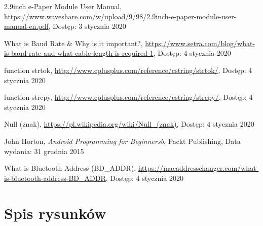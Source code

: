 \documentclass[a4paper,12pt, twoside]{article}
\begin{document}
\begin{thebibliography}{}
		2.9inch e-Paper Module User Manual,
		\newline\url{https://www.waveshare.com/w/upload/9/98/2.9inch-e-paper-module-user-manual-en.pdf}, 
		\newline Dostęp: 3 stycznia 2020
		
		What is Baud Rate \& Why is it important?,
		\newline\url{https://www.setra.com/blog/what-is-baud-rate-and-what-cable-length-is-required-1}, 
		\newline Dostęp: 4 stycznia 2020
		
		function strtok,
		\newline\url{http://www.cplusplus.com/reference/cstring/strtok/}, 
		\newline Dostęp: 4 stycznia 2020
		
		function strcpy,
		\newline\url{http://www.cplusplus.com/reference/cstring/strcpy/}, 
		\newline Dostęp: 4 stycznia 2020
		
		Null (znak),
		\newline\url{https://pl.wikipedia.org/wiki/Null_(znak)}, 
		\newline Dostęp: 4 stycznia 2020
		
	    John Horton, \textit{Android Programming for Beginnersb}, Packt Publishing,
		\newline Data wydania: 31 grudnia 2015
		
		What is Bluetooth Address (BD\_ADDR),
		\newline\url{https://macaddresschanger.com/what-is-bluetooth-address-BD_ADDR}, 
		\newline Dostęp: 4 stycznia 2020
		
	\end{thebibliography}
	\endgroup
	
	\newpage
	\section{Spis rysunków}
	\begingroup
	\renewcommand{\section}[2]{}%
	\listoffigures
	\endgroup
	
	\newpage
	\section{Spis algorytmów}
	\begingroup
	\renewcommand{\section}[2]{}%
	\lstlistoflistings
	\renewcommand{\section}[2]{}%
	\endgroup
	
\end{document}
